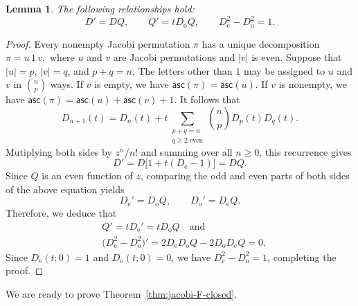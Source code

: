 \documentclass[12pt]{article}
\numberwithin{equation}{section}
\theoremstyle{plain}
\newtheorem{lemma}[theorem]{Lemma}
\def\asc{\mathsf{asc}}
\begin{document}
   			\begin{lemma}
   				\label{lem:jacobi-D}
   				The following relationships hold: 
   				\begin{equation}
   					D'=DQ,
   					\qquad
   					Q'=tD_{\mathrm o}Q,
   					\qquad
   					D_{\mathrm e}^{2}-D_{\mathrm o}^{2}=1.
   					\label{eq:jacobi-D-relations}
   				\end{equation}
   			\end{lemma}
   			
   			\begin{proof}
   				Every nonempty Jacobi permutation $\pi$ has a unique decomposition
   				$
   				\pi=u\,1\,v,
   				$
   				where   $u$ and $v$ are Jacobi permutations and
   				$|v|$ is even.    Suppose
   				that $|u|=p$, $|v|=q$, and $p+q=n$.  The letters
   				other than $1$ may be assigned to $u$ and $v$ in $\binom np$ ways.   If $v$ is empty, we have $\asc(\pi)=\asc(u)$.  If $v$ is nonempty, we have 
   				$\asc(\pi)=\asc(u)+\asc(v)+1$.   It follows that
   				\[
   				D_{n+1}(t)
   				=D_n(t)
   				+t\!\sum_{\substack{p+q=n\\q\geq2\;\mathrm{even}}}
   				\binom np D_p(t)D_q(t).
   				\]
   				Mutiplying both sides  by $z^n/n!$ and summing over all  $n\geq0$, this
   				recurrence gives 
   				\[
   				D'=D\bigl[1+t(D_{\mathrm e}-1)\bigr]=DQ.
   				\]
   				Since 
   				$Q$
   				is an even function of 
   				$z$, 
   				comparing the odd and even parts of both sides of the above equation yields
   				\[
   				D_{\mathrm e}'=D_{\mathrm o}Q,
   				\qquad
   				D_{\mathrm o}'=D_{\mathrm e}Q.
   				\]
   				Therefore, we deduce that 
   				\begin{align*}
   					&Q'=tD_{\mathrm e}'=tD_{\mathrm o}Q\quad\text{and}\\
   					&\bigl(D_{\mathrm e}^{2}-D_{\mathrm o}^{2}\bigr)'
   					=2D_{\mathrm e}D_{\mathrm o}Q-2D_{\mathrm o}D_{\mathrm e}Q=0.
   				\end{align*}
   				Since $D_{\mathrm e}(t;0)=1$ and $D_{\mathrm o}(t;0)=0$, we have
   				$D_{\mathrm e}^{2}-D_{\mathrm o}^{2}=1$, completing the proof.  
   			\end{proof}
			
			We are ready to prove Theorem~\ref{thm:jacobi-F-closed}. 
   			
\end{document}
